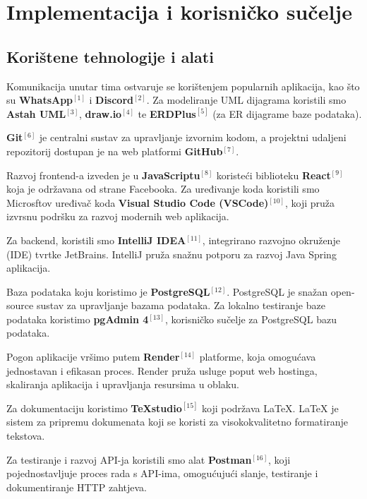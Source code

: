 \chapter{Implementacija i korisničko sučelje}
		
		
		\section{Korištene tehnologije i alati}
			 		
			Komunikacija unutar tima ostvaruje se korištenjem popularnih aplikacija, kao što su \textbf{WhatsApp}$^{[1]}$ i \textbf{Discord}$^{[2]}$. Za modeliranje UML dijagrama koristili smo \textbf{Astah UML}$^{[3]}$,  \textbf{draw.io}$^{[4]}$ te \textbf{ERDPlus}$^{[5]}$ (za ER dijagrame baze podataka). 
			
			\textbf{Git}$^{[6]}$ je centralni sustav za upravljanje izvornim kodom, a projektni udaljeni repozitorij dostupan je na web platformi \textbf{GitHub}$^{[7]}$.
			
			Razvoj frontend-a izveden je u \textbf{JavaScriptu}$^{[8]}$ koristeći biblioteku \textbf{React}$^{[9]}$ koja je održavana od strane Facebooka. Za uređivanje koda koristili smo Microsftov uređivač koda \textbf{Visual Studio Code (VSCode)}$^{[10]}$, koji pruža izvrsnu podršku za razvoj modernih web aplikacija.
			
			Za backend, koristili smo \textbf{IntelliJ IDEA}$^{[11]}$, integrirano razvojno okruženje (IDE) tvrtke JetBrains. IntelliJ pruža snažnu potporu za razvoj Java Spring aplikacija.
			
			Baza podataka koju koristimo je \textbf{PostgreSQL}$^{[12]}$. PostgreSQL je snažan open-source sustav za upravljanje bazama podataka. Za lokalno testiranje baze podataka koristimo \textbf{pgAdmin 4}$^{[13]}$, korisničko sučelje za PostgreSQL bazu podataka.
			
			Pogon aplikacije vršimo putem \textbf{Render}$^{[14]}$ platforme, koja omogućava jednostavan i efikasan proces. Render pruža usluge poput web hostinga, skaliranja aplikacija i upravljanja resursima u oblaku.
			
			Za dokumentaciju koristimo \textbf{TeXstudio}$^{[15]}$ koji podržava LaTeX. LaTeX je sistem za pripremu dokumenata koji se koristi za visokokvalitetno formatiranje tekstova.
			
			Za testiranje i razvoj API-ja koristili smo alat \textbf{Postman}$^{[16]}$, koji pojednostavljuje proces rada s API-ima, omogućujući slanje, testiranje i dokumentiranje HTTP zahtjeva.
			
